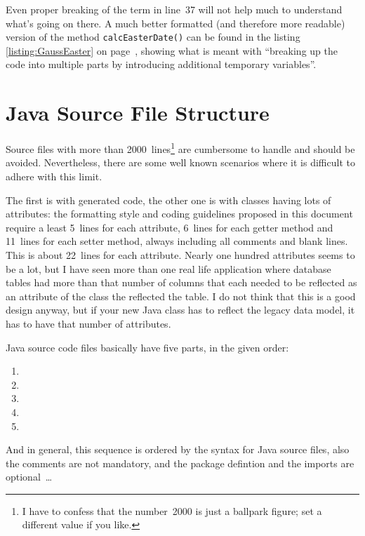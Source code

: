 \documentclass[11pt,a4paper, titlepage, parskip=half, headsepline, footsepline, cleardoublepage=current, headheight=1cm]{scrbook}
\newcommand*{\tqvref}[1]{\hyperref[{#1}]{\ref*{#1}} on page~\pageref{#1}}
\begin{document}
Even proper breaking of the term in line~37 will not help much to understand what's going on there. A much better formatted (and therefore more readable) version of the method \lstinline|calcEasterDate()| can be found in the listing \tqvref{listing:GaussEaster}, showing what is meant with “breaking up the code into multiple parts by introducing additional temporary variables”.


\section{Java Source File Structure}
Source files with more than 2000~lines\footnote{I have to confess that the number~2000 is just a ballpark figure; set a different value if you like.} are cumbersome to handle and should be avoided. Nevertheless, there are some well known scenarios where it is difficult to adhere with this limit.

The first is with generated code, the other one is with classes having lots of attributes: the formatting style and coding guidelines proposed in this document require a least 5~lines for each attribute, 6~lines for each getter method and 11~lines for each setter method, always including all comments and blank lines. This is about 22~lines for each attribute. Nearly one hundred attributes seems to be a lot, but I have seen more than one real life application where database tables had more than that number of columns that each needed to be reflected as an attribute of the class the reflected the table. I do not think that this is a good design anyway, but if your new Java class has to reflect the legacy data model, it has to have that number of attributes.

Java source code files basically have five parts, in the given order:
\begin{enumerate}[nosep]
\item{}
\item{}
\item{}
\item{}
\item{}
\end{enumerate}
And in general, this sequence is ordered by the syntax for Java source files, also the comments are not mandatory, and the package defintion and the imports are optional~…
\end{document}
